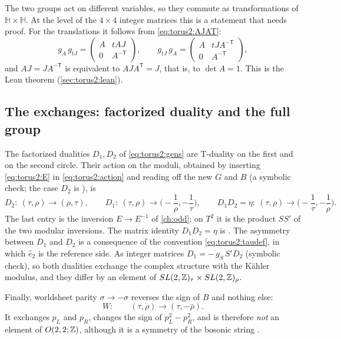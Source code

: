 The two groups act on different variables, so they commute as transformations of
$\mathbb H\times\mathbb H$. At the level of the $4\times4$ integer matrices this is a
statement that needs proof. For the translations it follows from \eqref{eq:torus2:AJAT}:
\begin{equation}\label{eq:torus2:commute}
 g_A\,g_{tJ}=\begin{pmatrix}A&tAJ\\0&A^{-\mathsf T}\end{pmatrix},\qquad
 g_{tJ}\,g_A=\begin{pmatrix}A&tJA^{-\mathsf T}\\0&A^{-\mathsf T}\end{pmatrix},
\end{equation}
and $AJ=JA^{-\mathsf T}$ is equivalent to $AJA^{\mathsf T}=J$, that is, to $\det A=1$. This
is the Lean theorem  \TA{} (\cref{sec:torus2:lean}).

\subsection{The exchanges: factorized duality and the full group}

The factorized dualities $D_1,D_2$ of \eqref{eq:torus2:gens} are T-duality on the first and
on the second circle. Their action on the moduli, obtained by inserting
\eqref{eq:torus2:E} in \eqref{eq:torus2:action} and reading off the new $G$ and $B$ (a symbolic
check; the case $D_2$ is ), is
\begin{equation}\label{eq:torus2:D}
 D_2:\ (\tau,\rho)\to(\rho,\tau),\qquad
 D_1:\ (\tau,\rho)\to\Big(-\frac1\rho,-\frac1\tau\Big),\qquad
 D_1D_2=\eta:\ (\tau,\rho)\to\Big(-\frac1\tau,-\frac1\rho\Big).
\end{equation}
The last entry is the inversion $E\to E^{-1}$ of \cref{ch:odd}; on $T^2$ it is the product
$SS'$ of the two modular inversions. The matrix identity $D_1D_2=\eta$ is
 \TA. The asymmetry between $D_1$ and $D_2$ is a consequence of the
convention \eqref{eq:torus2:taudef}, in which $\hat e_2$ is the reference side. As integer
matrices $D_1=-\,g_S\,S'D_2$ (symbolic check), so both dualities exchange the complex structure
with the K\"ahler modulus, and they differ by an element of
$SL(2,\mathbb{Z})_\tau\times SL(2,\mathbb{Z})_\rho$.

Finally, worldsheet parity $\sigma\to-\sigma$ reverses the sign of $B$ and nothing else:
\begin{equation}\label{eq:torus2:W}
 W:\qquad(\tau,\rho)\to(\tau,-\bar\rho).
\end{equation}
It exchanges $p_L$ and $p_R$, changes the sign of $p_L^2-p_R^2$, and is therefore \emph{not}
an element of $O(2,2;\mathbb{Z})$, although it is a symmetry of the bosonic string
.

